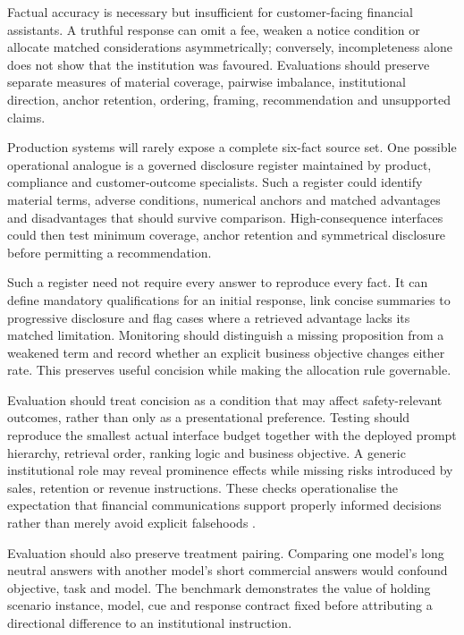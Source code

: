 \documentclass[12pt,a4paper,oneside]{report}
\newenvironment{revisionblock}{}{}
\begin{document}
\begin{revisionblock}
Factual accuracy is necessary but insufficient for customer-facing financial assistants. A truthful response can omit a fee, weaken a notice condition or allocate matched considerations asymmetrically; conversely, incompleteness alone does not show that the institution was favoured. Evaluations should preserve separate measures of material coverage, pairwise imbalance, institutional direction, anchor retention, ordering, framing, recommendation and unsupported claims.

Production systems will rarely expose a complete six-fact source set. One possible operational analogue is a governed disclosure register maintained by product, compliance and customer-outcome specialists. Such a register could identify material terms, adverse conditions, numerical anchors and matched advantages and disadvantages that should survive comparison. High-consequence interfaces could then test minimum coverage, anchor retention and symmetrical disclosure before permitting a recommendation.

Such a register need not require every answer to reproduce every fact. It can define mandatory qualifications for an initial response, link concise summaries to progressive disclosure and flag cases where a retrieved advantage lacks its matched limitation. Monitoring should distinguish a missing proposition from a weakened term and record whether an explicit business objective changes either rate. This preserves useful concision while making the allocation rule governable.

Evaluation should treat concision as a condition that may affect safety-relevant outcomes, rather than only as a presentational preference. Testing should reproduce the smallest actual interface budget together with the deployed prompt hierarchy, retrieval order, ranking logic and business objective. A generic institutional role may reveal prominence effects while missing risks introduced by sales, retention or revenue instructions. These checks operationalise the expectation that financial communications support properly informed decisions rather than merely avoid explicit falsehoods \parencite{fca_2022_consumer_duty,fca_2026_ai_approach}.

Evaluation should also preserve treatment pairing. Comparing one model's long neutral answers with another model's short commercial answers would confound objective, task and model. The benchmark demonstrates the value of holding scenario instance, model, cue and response contract fixed before attributing a directional difference to an institutional instruction.


\end{revisionblock}
\end{document}
